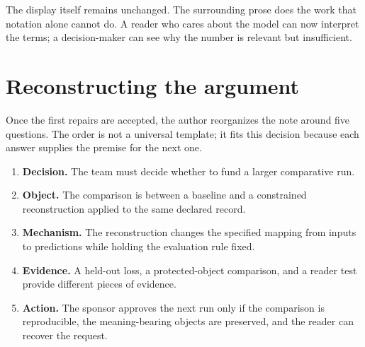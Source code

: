 The display itself remains unchanged. The surrounding prose does the work that
notation alone cannot do. A reader who cares about the model can now interpret
the terms; a decision-maker can see why the number is relevant but insufficient.

\section{Reconstructing the argument}
\label{sec:case-argument}

Once the first repairs are accepted, the author reorganizes the note around
five questions. The order is not a universal template; it fits this decision
because each answer supplies the premise for the next one.

\begin{enumerate}
\item \textbf{Decision.} The team must decide whether to fund a larger
      comparative run.
\item \textbf{Object.} The comparison is between a baseline and a constrained
      reconstruction applied to the same declared record.
\item \textbf{Mechanism.} The reconstruction changes the specified mapping
      from inputs to predictions while holding the evaluation rule fixed.
\item \textbf{Evidence.} A held-out loss, a protected-object comparison, and
      a reader test provide different pieces of evidence.
\item \textbf{Action.} The sponsor approves the next run only if the
      comparison is reproducible, the meaning-bearing objects are preserved,
      and the reader can recover the request.
\end{enumerate}

